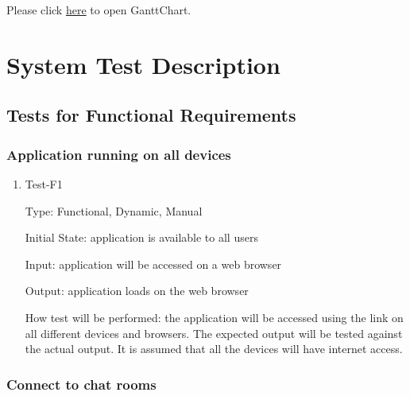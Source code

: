 \documentclass[12pt, titlepage]{article}
\begin{document}
Please click \href{run:../../ProjectSchedule/GanttChart.gan}{here} to open GanttChart.

\section{System Test Description}
	
\subsection{Tests for Functional Requirements}

\subsubsection{Application running on all devices}
		

\begin{enumerate}

\item{Test-F1\\}

Type: Functional, Dynamic, Manual
					
Initial State: application is available to all users
					
Input: application will be accessed on a web browser
					
Output: application loads on the web browser
					
How test will be performed: the application will be accessed using the link on all different devices and browsers. The expected output will be tested against the actual output. It is assumed that all the devices will have internet access. 
					
\end{enumerate}

\subsubsection{Connect to chat rooms}
		
\end{document}
